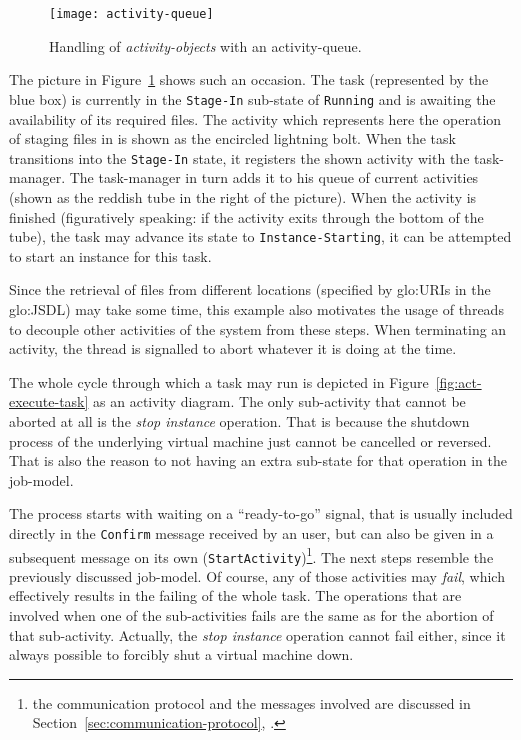 \begin{figure}[ht]
  \centering
  \texttt{[image: activity-queue]}
  \caption{Handling of \emph{activity-objects} with an activity-queue.}
  \label{fig:activity-queue}
\end{figure}

The picture in Figure~\ref{fig:activity-queue} shows such an occasion. The
task (represented by  the blue box) is currently  in the \texttt{Stage-In}
sub-state  of \texttt{Running}  and is  awaiting the  availability  of its
required  files.  The  activity  which represents  here  the operation  of
staging files in is shown as  the encircled lightning bolt.  When the task
transitions  into  the \texttt{Stage-In}  state,  it  registers the  shown
activity with  the task-manager. The task-manager  in turn adds  it to his
queue of current activities (shown as the reddish tube in the right of the
picture).  When  the activity is  finished (figuratively speaking:  if the
activity exits through  the bottom of the tube), the  task may advance its
state to \texttt{Instance-Starting}, \ie it  can be attempted to start an
instance for this task.

Since  the  retrieval of  files  from  different  locations (specified  by
\gls{glo:URI}s  in the \gls{glo:JSDL})  may take  some time,  this example
also motivates  the usage of threads  to decouple other  activities of the
system  from these  steps. When  terminating  an activity,  the thread  is
signalled to abort whatever it is doing at the time.

\bigskip

The  whole   cycle  through   which  a  task   may  run  is   depicted  in
Figure~\ref{fig:act-execute-task}  as  an   activity  diagram.   The  only
sub-activity that  cannot be  aborted at all  is the  \emph{stop instance}
operation. That is because the  shutdown process of the underlying virtual
machine just cannot  be cancelled or reversed. That is  also the reason to
not having an extra sub-state for that operation in the job-model.

The  process starts  with waiting  on  a ``ready-to-go''  signal, that  is
usually included  directly in the \texttt{Confirm} message  received by an
user,  but  can  also  be  given  in  a  subsequent  message  on  its  own
(\texttt{Start\-Activity})\footnote{the  communication  protocol  and  the
  messages           involved          are           discussed          in
  Section~\ref{sec:communication-protocol},
  \emph{}.}.  The  next steps resemble
the previously discussed job-model. Of course, any of those activities may
\emph{fail}, which effectively  results in the failing of  the whole task.
The operations that are involved  when one of the sub-activities fails are
the  same  as  for  the  abortion of  that  sub-activity.   Actually,  the
\emph{stop  instance}  operation  cannot  fail  either,  since  it  always
possible to forcibly shut a virtual machine down.


